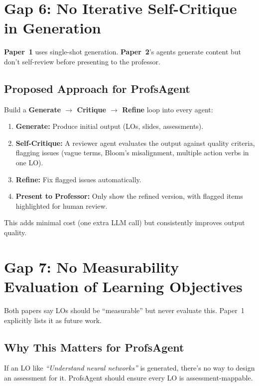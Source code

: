 \documentclass[11pt,a4paper]{article}
\begin{document}
\section{Gap 6: No Iterative Self-Critique in Generation}

\textbf{Paper~1} uses single-shot generation. \textbf{Paper~2}'s agents generate content but don't self-review before presenting to the professor.

\subsection{Proposed Approach for ProfsAgent}
Build a \textbf{Generate $\to$ Critique $\to$ Refine} loop into every agent:
\begin{enumerate}[nosep]
    \item \textbf{Generate:} Produce initial output (LOs, slides, assessments).
    \item \textbf{Self-Critique:} A reviewer agent evaluates the output against quality criteria, flagging issues (vague terms, Bloom's misalignment, multiple action verbs in one LO).
    \item \textbf{Refine:} Fix flagged issues automatically.
    \item \textbf{Present to Professor:} Only show the refined version, with flagged items highlighted for human review.
\end{enumerate}

This adds minimal cost (one extra LLM call) but consistently improves output quality.

\section{Gap 7: No Measurability Evaluation of Learning Objectives}

Both papers say LOs should be ``measurable'' but never evaluate this. Paper~1 explicitly lists it as future work.

\subsection{Why This Matters for ProfsAgent}
If an LO like \textit{``Understand neural networks''} is generated, there's no way to design an assessment for it. ProfsAgent should ensure every LO is assessment-mappable.
\end{document}

